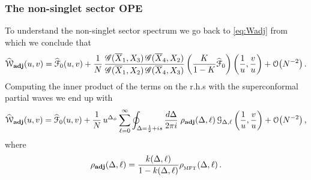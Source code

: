 \documentclass[11pt]{article}
\newcommand{\Xb}{\overline{X}}
\newcommand{\mft}{\text{\tiny MFT}}
\begin{document}
\subsubsection{The non-singlet sector OPE}
\label{sec:non-singletOPE}

To understand the non-singlet sector spectrum we go back to \eqref{eq:Wadj} from which we conclude that 
%
\begin{equation}\label{eq:Wadjnormal}
\widehat{\mathcal{W}}_\textbf{adj}(u,v) = \widehat{\mathcal{F}}_0(u,v) + \frac{1}{N}\, \frac{\mathscr{G}(\Xb_{1},X_{3})\, \mathscr{G}(\Xb_{4},X_{2})}{\mathscr{G}(\Xb_{1},X_{2})\,   \mathscr{G}(\Xb_{4},X_{3})} \left(\frac{K}{1-K} \widehat{\mathcal{F}}_0\right)\left(\frac{1}{u},\frac{v}{u}\right)  + \order{N^{-2}} \,. 
\end{equation}  
%
Computing the inner product of the terms on the r.h.s with the superconformal partial waves we end up with
%
\begin{equation}\label{eq:Wadjdecompose}
\widehat{\mathcal{W}}_\textbf{adj}(u,v) =  \widehat{\mathcal{F}}_0(u,v)+ \frac{1}{ N}\,
  u^{\Delta_\phi}\sum_{\ell = 0}^{\infty}\oint_{\Delta=\frac{1}{2}+is}\frac{d\Delta}{2\pi i} \; \rho_\textbf{adj}(\Delta,\ell)\, \mathcal{G}_{\Delta,\ell}\left(\frac{1}{u}, \frac{v}{u}\right) + \order{N^{-2}} \,,
\end{equation}  
%
where 
%
\begin{equation}\label{eq:rhoadj}
 \rho_\textbf{adj}(\Delta,\ell)  = 
 \frac{k(\Delta,\ell)}{1-k(\Delta,\ell)}  \rho_{_\mft}(\Delta,\ell)\,.
\end{equation}  
% 
 
\end{document}
